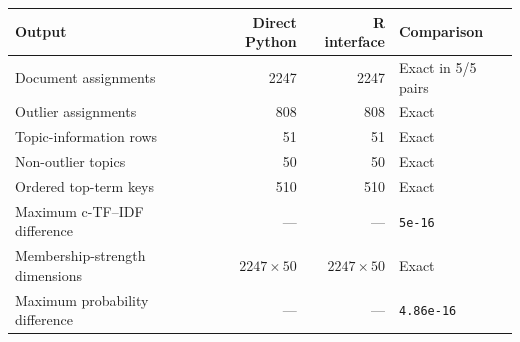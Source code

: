 \begin{tabular}{lrrl}
\toprule
Output & Direct Python & R interface & Comparison \\
\midrule
Document assignments & 2247 & 2247 & Exact in 5/5 pairs \\
Outlier assignments & 808 & 808 & Exact \\
Topic-information rows & 51 & 51 & Exact \\
Non-outlier topics & 50 & 50 & Exact \\
Ordered top-term keys & 510 & 510 & Exact \\
Maximum c-TF--IDF difference & --- & --- & \texttt{5e-16} \\
Membership-strength dimensions & $2247\times50$ & $2247\times50$ & Exact \\
Maximum probability difference & --- & --- & \texttt{4.86e-16} \\
\bottomrule
\end{tabular}
